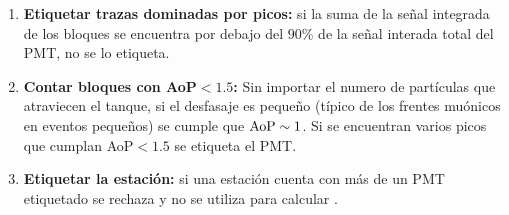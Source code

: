 \begin{enumerate}
	 \item \textbf{Etiquetar trazas dominadas por picos:} si la suma de la señal integrada de los bloques se encuentra por debajo del $90\%$ de la señal interada total del PMT, no se lo etiqueta.
	 \item \textbf{Contar bloques con AoP$<1.5$:} Sin importar el numero de partículas que atraviecen el tanque, si el desfasaje es pequeño (típico de los frentes muónicos en eventos pequeños) se cumple que ${\rm AoP}\sim 1$. Si se encuentran varios picos que cumplan AoP$<1.5$ se etiqueta el PMT.
	 \item \textbf{Etiquetar la estación:} si una estación cuenta con más de un PMT etiquetado se rechaza y no se utiliza para calcular \aop{}.
\end{enumerate}

